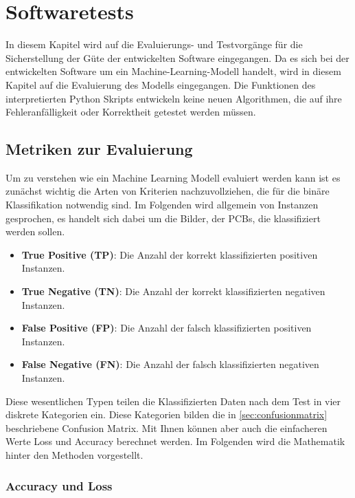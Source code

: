 \chapter{Softwaretests} \label{chap:softwaretests}

In diesem Kapitel wird auf die Evaluierungs- und Testvorgänge für die Sicherstellung der Güte der entwickelten Software eingegangen.
Da es sich bei der entwickelten Software um ein Machine-Learning-Modell handelt, wird in diesem Kapitel auf die Evaluierung des Modells eingegangen. Die Funktionen des interpretierten Python Skripts entwickeln keine neuen Algorithmen, die auf ihre Fehleranfälligkeit oder Korrektheit getestet werden müssen.

\section{Metriken zur Evaluierung} \label{sec:metriken}

Um zu verstehen wie ein Machine Learning Modell evaluiert werden kann ist es zunächst wichtig die Arten von Kriterien nachzuvollziehen, die für die binäre Klassifikation notwendig sind. Im Folgenden wird allgemein von Instanzen gesprochen, es handelt sich dabei um die Bilder, der PCBs, die klassifiziert werden sollen.

\begin{itemize}
    \item \textbf{True Positive (TP)}: Die Anzahl der korrekt klassifizierten positiven Instanzen.
    \item \textbf{True Negative (TN)}: Die Anzahl der korrekt klassifizierten negativen Instanzen.
    \item \textbf{False Positive (FP)}: Die Anzahl der falsch klassifizierten positiven Instanzen.
    \item \textbf{False Negative (FN)}: Die Anzahl der falsch klassifizierten negativen Instanzen.
\end{itemize}

Diese wesentlichen Typen teilen die Klassifizierten Daten nach dem Test in vier diskrete Kategorien ein. Diese Kategorien bilden die 
in \autoref{sec:confusionmatrix} beschriebene Confusion Matrix. Mit Ihnen können aber auch die einfacheren Werte Loss und Accuracy berechnet werden. Im Folgenden wird die Mathematik hinter den Methoden vorgestellt.

\subsection{Accuracy und Loss} \label{sec:accuracy}

